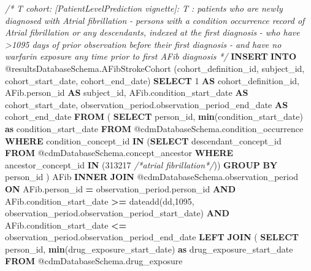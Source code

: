 \documentclass[
]{article}
\newenvironment{Shaded}{\begin{snugshade}}{\end{snugshade}}
\newcommand{\CommentTok}[1]{\textcolor[rgb]{0.56,0.35,0.01}{\textit{#1}}}
\newcommand{\DecValTok}[1]{\textcolor[rgb]{0.00,0.00,0.81}{#1}}
\newcommand{\FunctionTok}[1]{\textcolor[rgb]{0.13,0.29,0.53}{\textbf{#1}}}
\newcommand{\KeywordTok}[1]{\textcolor[rgb]{0.13,0.29,0.53}{\textbf{#1}}}
\newcommand{\NormalTok}[1]{#1}
\newcommand{\OperatorTok}[1]{\textcolor[rgb]{0.81,0.36,0.00}{\textbf{#1}}}
\begin{document}
\begin{Shaded}
\begin{Highlighting}[]
\CommentTok{/*}
\CommentTok{T cohort:  [PatientLevelPrediction vignette]:  T : patients who are newly }
\CommentTok{diagnosed with Atrial fibrillation}
\CommentTok{{-} persons with a condition occurrence record of \textquotesingle{}Atrial fibrillation\textquotesingle{} or }
\CommentTok{any descendants, indexed at the first diagnosis}
\CommentTok{{-} who have \textgreater{}1095 days of prior observation before their first diagnosis}
\CommentTok{{-} and have no warfarin exposure any time prior to first AFib diagnosis}
\CommentTok{*/}
\KeywordTok{INSERT} \KeywordTok{INTO}\NormalTok{ @resultsDatabaseSchema.AFibStrokeCohort (cohort\_definition\_id, }
\NormalTok{subject\_id, }
\NormalTok{cohort\_start\_date, }
\NormalTok{cohort\_end\_date)}
\KeywordTok{SELECT} \DecValTok{1} \KeywordTok{AS}\NormalTok{ cohort\_definition\_id,}
\NormalTok{AFib.person\_id }\KeywordTok{AS}\NormalTok{ subject\_id,}
\NormalTok{AFib.condition\_start\_date }\KeywordTok{AS}\NormalTok{ cohort\_start\_date,}
\NormalTok{observation\_period.observation\_period\_end\_date }\KeywordTok{AS}\NormalTok{ cohort\_end\_date}
\KeywordTok{FROM}
\NormalTok{(}
  \KeywordTok{SELECT}\NormalTok{ person\_id, }\FunctionTok{min}\NormalTok{(condition\_start\_date) }\KeywordTok{as}\NormalTok{ condition\_start\_date}
  \KeywordTok{FROM}\NormalTok{ @cdmDatabaseSchema.condition\_occurrence}
  \KeywordTok{WHERE}\NormalTok{ condition\_concept\_id }\KeywordTok{IN}\NormalTok{ (}\KeywordTok{SELECT}\NormalTok{ descendant\_concept\_id }\KeywordTok{FROM} 
\NormalTok{  @cdmDatabaseSchema.concept\_ancestor }\KeywordTok{WHERE}\NormalTok{ ancestor\_concept\_id }\KeywordTok{IN} 
\NormalTok{  (}\DecValTok{313217} \CommentTok{/*atrial fibrillation*/}\NormalTok{))}
  \KeywordTok{GROUP} \KeywordTok{BY}\NormalTok{ person\_id}
\NormalTok{) AFib}
  \KeywordTok{INNER} \KeywordTok{JOIN}\NormalTok{ @cdmDatabaseSchema.observation\_period}
  \KeywordTok{ON}\NormalTok{ AFib.person\_id }\OperatorTok{=}\NormalTok{ observation\_period.person\_id}
  \KeywordTok{AND}\NormalTok{ AFib.condition\_start\_date }\OperatorTok{\textgreater{}=}\NormalTok{ dateadd(dd,}\DecValTok{1095}\NormalTok{, }
\NormalTok{  observation\_period.observation\_period\_start\_date)}
  \KeywordTok{AND}\NormalTok{ AFib.condition\_start\_date }\OperatorTok{\textless{}=}\NormalTok{ observation\_period.observation\_period\_end\_date}
  \KeywordTok{LEFT} \KeywordTok{JOIN}
\NormalTok{  (}
  \KeywordTok{SELECT}\NormalTok{ person\_id, }\FunctionTok{min}\NormalTok{(drug\_exposure\_start\_date) }\KeywordTok{as}\NormalTok{ drug\_exposure\_start\_date}
  \KeywordTok{FROM}\NormalTok{ @cdmDatabaseSchema.drug\_exposure}

\end{Highlighting}
\end{Shaded}
\end{document}
